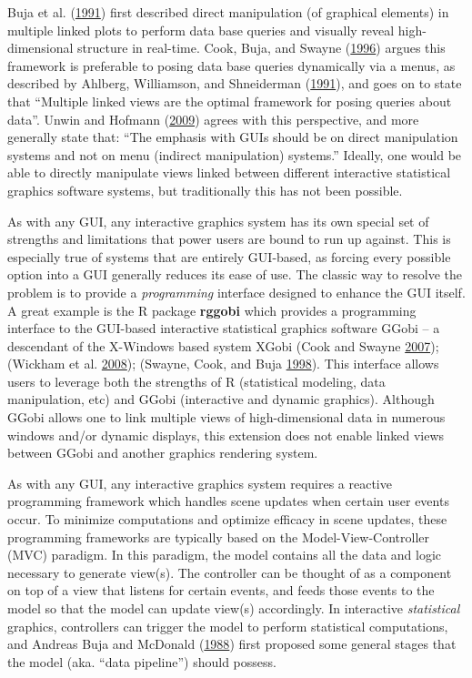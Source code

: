 \documentclass[12pt,]{isuthesis}
\begin{document}
Buja et al. (\protect\hyperlink{ref-Buja:1991vh}{1991}) first described
direct manipulation (of graphical elements) in multiple linked plots to
perform data base queries and visually reveal high-dimensional structure
in real-time. Cook, Buja, and Swayne
(\protect\hyperlink{ref-Cook:2007uk}{1996}) argues this framework is
preferable to posing data base queries dynamically via a menus, as
described by Ahlberg, Williamson, and Shneiderman
(\protect\hyperlink{ref-Ahlberg:1991}{1991}), and goes on to state that
``Multiple linked views are the optimal framework for posing queries
about data''. Unwin and Hofmann
(\protect\hyperlink{ref-Unwin:1999vp}{2009}) agrees with this
perspective, and more generally state that: ``The emphasis with GUIs
should be on direct manipulation systems and not on menu (indirect
manipulation) systems.'' Ideally, one would be able to directly
manipulate views linked between different interactive statistical
graphics software systems, but traditionally this has not been possible.

As with any GUI, any interactive graphics system has its own special set
of strengths and limitations that power users are bound to run up
against. This is especially true of systems that are entirely GUI-based,
as forcing every possible option into a GUI generally reduces its ease
of use. The classic way to resolve the problem is to provide a
\emph{programming} interface designed to enhance the GUI itself. A great
example is the R package \textbf{rggobi} which provides a programming
interface to the GUI-based interactive statistical graphics software
GGobi -- a descendant of the X-Windows based system XGobi (Cook and
Swayne \protect\hyperlink{ref-ggobi:2007}{2007}); (Wickham et al.
\protect\hyperlink{ref-rggobi}{2008}); (Swayne, Cook, and Buja
\protect\hyperlink{ref-xgobi}{1998}). This interface allows users to
leverage both the strengths of R (statistical modeling, data
manipulation, etc) and GGobi (interactive and dynamic graphics).
Although GGobi allows one to link multiple views of high-dimensional
data in numerous windows and/or dynamic displays, this extension does
not enable linked views between GGobi and another graphics rendering
system.

As with any GUI, any interactive graphics system requires a reactive
programming framework which handles scene updates when certain user
events occur. To minimize computations and optimize efficacy in scene
updates, these programming frameworks are typically based on the
Model-View-Controller (MVC) paradigm. In this paradigm, the model
contains all the data and logic necessary to generate view(s). The
controller can be thought of as a component on top of a view that
listens for certain events, and feeds those events to the model so that
the model can update view(s) accordingly. In interactive
\emph{statistical} graphics, controllers can trigger the model to
perform statistical computations, and Andreas Buja and McDonald
(\protect\hyperlink{ref-viewing-pipeline}{1988}) first proposed some
general stages that the model (aka. ``data pipeline'') should possess.
\end{document}
